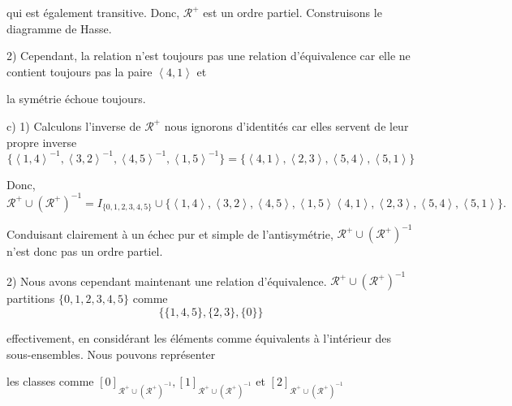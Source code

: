 \documentclass{article}
\newcommand{\tuple}[1]{\ensuremath{\left\langle #1 \right\rangle}}
\begin{document}
qui est également transitive. Donc, $ \mathcal{R}^+ $ est un ordre partiel. Construisons le diagramme de Hasse.

\begin{center}
    \begin{minipage}{0.3\textwidth}
    \end{minipage}
\end{center}

2) Cependant, la relation n’est toujours pas une relation d’équivalence car elle ne contient toujours pas la paire  $\tuple{4,1}$ et 

la symétrie échoue toujours.

\vspace{0.3cm}

c) 1)
Calculons l'inverse de $\mathcal{R}^{+}$ nous ignorons d'identités car elles servent de leur propre inverse
$$ \{ \tuple{1,4}^{-1},\tuple{3,2}^{-1},\tuple{4,5}^{-1},\tuple{1,5}^{-1} \} = 
\{ \tuple{4,1},\tuple{2,3},\tuple{5,4},\tuple{5,1} \}
$$

Donc,
$$ \mathcal{R}^{+} \cup (\mathcal{R}^{+})^{-1} = I_{\{0,1,2,3,4,5\}}\cup \{ \tuple{1,4},\tuple{3,2},\tuple{4,5},\tuple{1,5} 
\tuple{4,1},\tuple{2,3},\tuple{5,4},\tuple{5,1} \}.
$$

Conduisant clairement à un échec pur et simple de l'antisymétrie, $\mathcal{R}^{+} \cup (\mathcal{R}^{+})^{-1}$ n'est donc pas un ordre partiel.

2) Nous avons cependant maintenant une relation d'équivalence. $\mathcal{R}^{+} \cup (\mathcal{R}^{+})^{-1}$ partitions $ \{ 0,1,2,3,4,5 \}$ comme
$$\{ \{ 1,4,5 \} ,\{ 2,3 \} ,\{0\}\}$$


effectivement, en considérant les éléments comme équivalents à l'intérieur des sous-ensembles. Nous pouvons représenter 

les classes comme $[0]_{\mathcal{R}^{+} \cup (\mathcal{R}^{+})^{-1}}, [1]_{\mathcal{R}^{+} \cup (\mathcal{R}^{+})^{-1}} $ et $ [2]_{\mathcal{R}^{+} \cup (\mathcal{R}^{+})^{-1}} $
\end{document}
